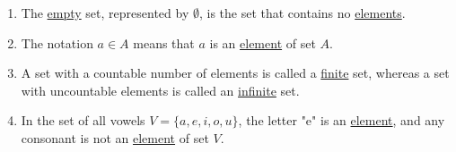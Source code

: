 \documentclass{article}
\begin{document}
\begin{enumerate}
    \item The \underline{empty} set, represented by \( \emptyset \), is the set that contains no \underline{elements}.\\[1em]

    \item The notation \( a \in A \) means that \( a \) is an \underline{element} of set \( A \).\\[1em]

    \item A set with a countable number of elements is called a \underline{finite} set, whereas a set with uncountable elements is called an \underline{infinite} set.\\[1em]

    \item In the set of all vowels \( V = \{ a, e, i, o, u \} \), the letter "e" is an \underline{element}, and any consonant is not an \underline{element} of set \( V \).\\[1em]
\end{enumerate}
\end{document}
